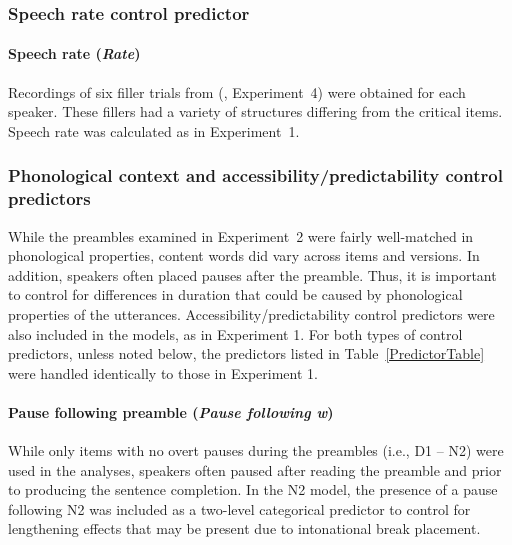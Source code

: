 \documentclass[12pt,titlepage]{article}
\newcommand{\IGNORE}[1]{} %
\begin{document}
\subsubsection{Speech rate control predictor}

\paragraph{Speech rate (\textit{Rate})} Recordings of six filler trials from \citeauthor{SolomonPearlmutter04} (, Experiment~4) were obtained for each speaker.  These fillers had a variety of structures differing from the critical items. Speech rate was calculated as in Experiment~1. \IGNORE{This predictor is referred to as \textit{Speech rate} in Table~\ref{PredictorTable}. }


\subsubsection{Phonological context and accessibility/predictability control predictors}

While the preambles examined in Experiment~2 were fairly well-matched in phonological properties, content words did vary across items and versions. In addition, speakers often placed pauses after the preamble.  Thus, it is important to control for differences in duration that could be caused by phonological properties of the utterances.  Accessibility/predictability control predictors were also included in the models, as in Experiment 1.  For both types of control predictors, unless noted below, the predictors listed in Table~\ref{PredictorTable} were handled identically to those in Experiment 1.



\paragraph{Pause following preamble (\textit{Pause following \textit{w}})} While only items with no overt pauses during the preambles (i.e., D1 -- N2) were used in the analyses, speakers often paused after reading the preamble and prior to producing the sentence completion.  In the N2 model, the presence of a pause following N2 was included as a two-level categorical predictor to control for lengthening effects that may be present due to intonational break placement.  \IGNORE{This predictor is referred to as \textit{Pause following \textit{w}} in Table~\ref{PredictorTable}.}
\end{document}
